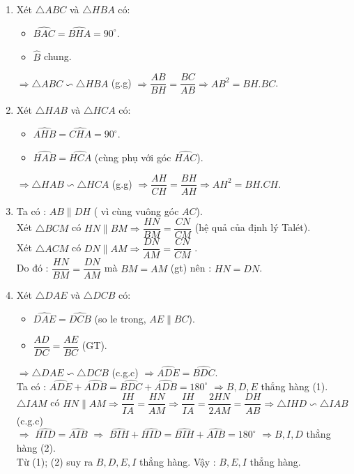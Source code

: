 \begin{ex}
{\begin{enumerate}
\item Xét $\triangle ABC$ và $ \triangle HBA$ có:
\begin{itemize}
\item $\widehat{BAC}=\widehat{BHA}=90^\circ$.
\item $\widehat{B}$ chung.
\end{itemize}
$\Rightarrow \triangle ABC \backsim \triangle HBA$ (g.g)  $ \Rightarrow   \dfrac{{AB}}{{BH}} = \dfrac{{BC}}{{AB}}   \Rightarrow  AB^2 = BH. BC$.
\item Xét $\triangle  HAB$ và $ \triangle  HCA$ có:
\begin{itemize}
\item $\widehat{AHB}=\widehat{CHA}=90^\circ$.
\item $\widehat{HAB}=\widehat{HCA}$ (cùng phụ với góc $\widehat{HAC}$).
\end{itemize}
$\Rightarrow \triangle  HAB \backsim \triangle  HCA$ (g.g)
 $ \Rightarrow   \dfrac{{AH}}{{CH}} = \dfrac{{BH}}{{AH}}   \Rightarrow  AH^2 = BH. CH$.
\item Ta có : $AB \parallel   DH$ ( vì cùng vuông góc $AC$). \\
Xét  $\triangle BCM$ có $HN \parallel BM \Rightarrow \dfrac{{HN}}{{BM}} = \dfrac{{CN}}{{CM}}$  (hệ quả của định lý Talét).\\
Xét  $\triangle ACM$ có $DN \parallel AM \Rightarrow  \dfrac{{DN}}{{AM}} = \dfrac{{CN}}{{CM}}$ . \\
Do đó :  $\dfrac{{HN}}{{BM}} = \dfrac{{DN}}{{AM}}$ mà $BM = AM$ (gt) nên : $HN = DN$.
\item  Xét $\triangle DAE$  và $ \triangle DCB$ có:
\begin{itemize}
\item $\widehat{DAE}=\widehat{DCB}$ (so le trong, $AE \parallel BC$).
\item $\dfrac{AD}{DC}=\dfrac{AE}{BC}$ (GT).
\end{itemize}
$\Rightarrow \triangle DAE \backsim \triangle DCB$ (c.g.c)  $ \Rightarrow \widehat {ADE} = \widehat {BDC}$.\\
Ta có :  $\widehat {ADE} + \widehat {ADB} = \widehat {BDC} + \widehat {ADB} = {180^\circ}$
 $ \Rightarrow  B, D, E$ thẳng hàng  (1).\\
 $\triangle IAM$ có $HN \parallel AM \Rightarrow  \dfrac{{IH}}{{IA}} = \dfrac{{HN}}{{AM}}   \Rightarrow   \dfrac{{IH}}{{IA}} = \dfrac{{2HN}}{{2AM}} = \dfrac{{DH}}{{AB}}   \Rightarrow   \triangle  IHD \backsim \triangle  IAB$ (c.g.c)\\
 $ \Rightarrow $  $\widehat {HID} = \widehat {AIB}$  $ \Rightarrow $  $\widehat {BIH} + \widehat {HID} = \widehat {BIH} + \widehat {AIB} = {180^\circ}$  $ \Rightarrow  B, I, D$ thẳng hàng  (2).\\
Từ (1); (2) suy ra $B, D, E, I $ thẳng hàng. Vậy : $B, E, I$ thẳng hàng.	
\end{enumerate}
}
 \end{ex}

